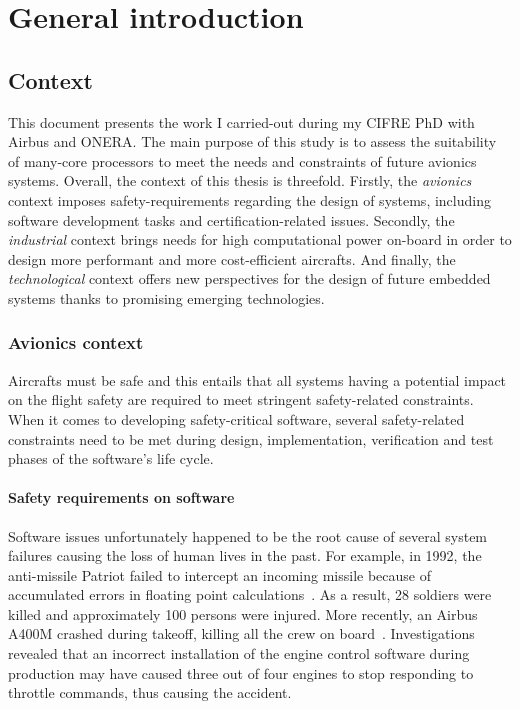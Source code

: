 \documentclass[main.tex]{subfiles}
\begin{document}
\chapter{General introduction}
\thispagestyle{chapstyle}
\minitoc



\section{Context}
This document presents the work I carried-out during my CIFRE PhD with Airbus and ONERA. The main purpose of this study is to assess the suitability of many-core processors to meet the needs and constraints of future avionics systems.
Overall, the context of this thesis is threefold. Firstly, the \emph{avionics} context imposes safety-requirements regarding the design of systems, including software development tasks and certification-related issues. Secondly, the \emph{industrial} context brings needs for high computational power on-board in order to design more performant and more cost-efficient aircrafts. And finally, the \emph{technological} context offers new perspectives for the design of future embedded systems thanks to promising emerging technologies.


\subsection{Avionics context}
Aircrafts must be safe and this entails that all systems having a potential impact on the flight safety are required to meet stringent safety-related constraints. When it comes to developing safety-critical software, several safety-related constraints need to be met during design, implementation, verification and test phases of the software's life cycle.


\subsubsection{Safety requirements on software}
Software issues unfortunately happened to be the root cause of several system failures causing the loss of human lives in the past. For example, in 1992, the anti-missile {\sc Patriot} failed to intercept an incoming missile because of accumulated errors in floating point calculations~\cite{MissilePatriot}. As a result, 28 soldiers were killed and approximately 100 persons were injured. More recently, an Airbus A400M crashed during takeoff, killing all the crew on board~\cite{CrashA400M}. Investigations revealed that an incorrect installation of the engine control software during production may have caused three out of four engines to stop responding to throttle commands, thus causing the accident.
\end{document}
